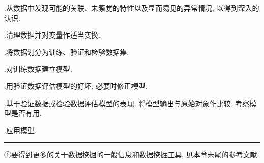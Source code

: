 .\quad 从数据中发现可能的关联、未察觉的特性以及显而易见的异常情况, 以得到深入的认识.

.\quad 清理数据并对变量作适当变换.

.\quad 将数据划分为训练、验证和检验数据集.

.\quad 对训练数据建立模型.

.\quad 用验证数据评估模型的好坏, 必要时修正模型.

.\quad 基于验证数据或检验数据评估模型的表现. 将模型输出与原始对象作比较. 考察模型是否有用.

.\quad 应用模型.

\vspace{6pt}
\noindent\rule{\linewidth}{0.4pt}
\par\vspace{2pt}
{\noindent ①\quad 要得到更多的关于数据挖掘的一般信息和数据挖掘工具, 见本章末尾的参考文献.\par}
